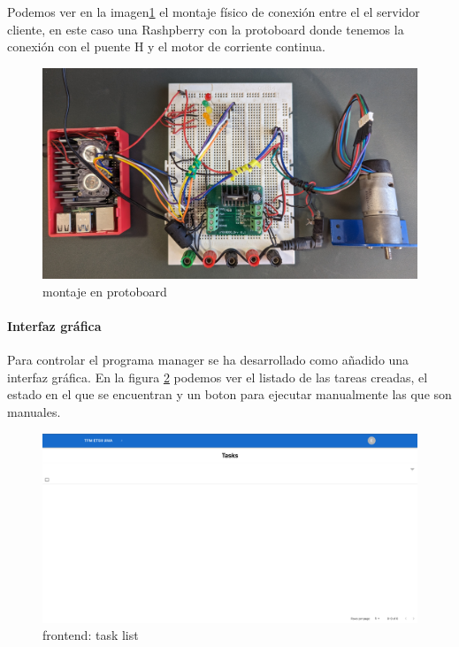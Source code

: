Podemos ver en la imagen\ref{fig:montaje en protoboard} el montaje físico de conexión entre el el servidor cliente, en este caso una Rashpberry con la protoboard donde tenemos la conexión con el puente H y el motor de corriente continua.

\begin{figure}[H]
    \centering
    \includegraphics[height=0.2\textheight]{./part/Ejecucion/Seguimiento/PuestaAPunto/img/montajeProtoboard}
    \caption{montaje en protoboard}\label{fig:montaje en protoboard}
\end{figure}

\paragraph{Interfaz gráfica}\label{par:interfaz}

Para controlar el programa manager se ha desarrollado como añadido una interfaz gráfica. En la figura \ref{fig:frontend} podemos ver el listado de las tareas creadas, el estado en el que se encuentran y un boton para ejecutar manualmente las que son manuales.

\begin{figure}[H]
    \centering
    \includegraphics[height=0.2\textheight]{./part/Ejecucion/Seguimiento/PuestaAPunto/img/frontend}
    \caption{frontend: task list}\label{fig:frontend}
\end{figure}

